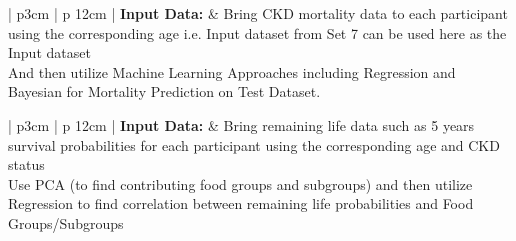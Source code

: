 \begin{table}[!ht]
\caption{\textbf{Set 8:  Utilize Regression and Bayesian to predict Mortality  using survey data with no data aggregation by Age Groups}}
\label{experiment-9}
\vspace{0.25cm}
\begin{tabular}{| p{3cm}  |  p {12cm} | }
\hline
\noindent \textbf{Input Data:} & Bring CKD mortality data to each participant using the corresponding age i.e. Input dataset from Set 7 can be used here as the Input dataset \\
\hline
{} { { \noindent  And then utilize Machine Learning Approaches including Regression and Bayesian for Mortality Prediction on Test Dataset.   }} \\
\hline
\end{tabular}
\end{table}

\begin{table}[!ht]
\caption{\textbf{Set 9: Association between Food Groups/Subgroups and Remaining Life for CKD Patients: Use not aggregated dietary intake data}}
\label{experiment-10}
\label{experiment-end}
\vspace{0.25cm}
\begin{tabular}{| p{3cm}  |  p {12cm} | }
\hline
\noindent \textbf{Input Data:} & {Bring remaining life data such as 5 years survival probabilities for each participant using the corresponding age and CKD status } \\
\hline
{} { Use PCA (to find contributing food groups and subgroups) and then utilize Regression to find correlation between remaining life probabilities and Food Groups/Subgroups} \\
\hline
\end{tabular}
\end{table}